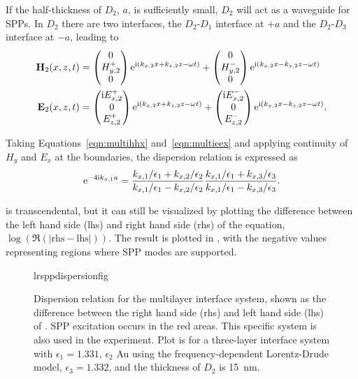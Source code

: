 If the half-thickness of $D_2$, $a$, is sufficiently small, $D_2$ will act
as a waveguide for SPPs.  In $D_2$ there are two interfaces, the
$D_2$-$D_1$ interface at $+a$ and the $D_2$-$D_3$ interface at $-a$,
leading to
\begin{align}
\mathbf{H}_2(x,z,t) &=
\begin{pmatrix}
0\\
H^+_{y,2}\\
0
\end{pmatrix} {\mathrm{e}}^{{\mathrm{i}}(k_{x,2}x+k_{z,2}z-\omega t)}
+
\begin{pmatrix}
0\\
H^-_{y,2}\\
0
\end{pmatrix} {\mathrm{e}}^{{\mathrm{i}}(k_{x,2}x-k_{z,2}z-\omega t)} \label{eqn:multihhx} \\
\mathbf{E}_2(x,z,t) &=
\begin{pmatrix}
{\mathrm{i}} E^+_{x,2}\\
0\\
E^+_{z,2}\\
\end{pmatrix} {\mathrm{e}}^{{\mathrm{i}}(k_{x,2}x+k_{z,2}z-\omega t)}
+
\begin{pmatrix}
{\mathrm{i}} E^-_{x,2}\\
0\\
E^-_{z,2}\\
\end{pmatrix} {\mathrm{e}}^{{\mathrm{i}}(k_{x,2}x-k_{z,2}z-\omega t)}.
\label{eqn:multieex}
\end{align}

Taking Equations~\ref{eqn:multihhx} and~\ref{eqn:multieex} and applying
continuity of $H_y$ and $E_x$ at the boundaries, the dispersion relation is
expressed as
\begin{equation}
{\mathrm{e}}^{-4 {\mathrm{i}} k_{x,1} a} = 
\frac{k_{x,1}/\epsilon_1 + k_{x,2}/\epsilon_2}
     {k_{x,1}/\epsilon_1 - k_{x,2}/\epsilon_2}
\frac{k_{x,1}/\epsilon_1 + k_{x,3}/\epsilon_3}
     {k_{x,1}/\epsilon_1 - k_{x,3}/\epsilon_3}.
\label{eqn:lrsppdispersion}
\end{equation}

 is transcendental, but it can still be
visualized by plotting the difference between the left hand side (lhs) and
right hand side (rhs) of the equation, 
$\log\left(\Re\left(|\mathrm{rhs}-\mathrm{lhs}|\right)\right)$.  The result
is plotted in , with the negative
values representing regions where SPP modes are supported.

\begin{figure}[ht]
 \centering
{lrsppdispersionfig}
\caption{Dispersion relation for the multilayer interface system, shown as the difference
 between the right hand side (rhs) and left hand side (lhs) of
.  SPP excitation occurs in the red areas.
This specific system is also used in the experiment.  Plot is for a three-layer interface system with $\epsilon_1=1.331$, $\epsilon_2$ Au using the
frequency-dependent Lorentz-Drude model, $\epsilon_3=1.332$, and the
thickness of $D_2$ is \SI{15}{\nano\meter}.  }
\label{fig:lrsppdispersionrelation}
\end{figure}

